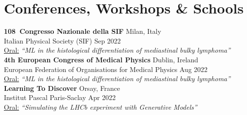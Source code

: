 \newcommand{\event}[2]
  {\normalsize \textbf{\color{hlcolor-0} #1} \hfill {\color{hlcolor-2} #2}}
  
\newcommand{\organizer}[2]
  {\small \color{hlcolor-1} {#1} \hfill {#2}}
  
\newcommand{\contribution}[3][]
  {\normalsize \color{maincolor} \ul{#2:} \emph{``#3''} {#1}}
  
\newcommand{\theme}[1]
  {\normalsize \color{maincolor} \ul{Theme:} \emph{#1}}
  
\newcommand{\button}[2]
  {\large \color{maincolor} \href{#1}{#2}}
  

\section*{Conferences, Workshops \& Schools}
\begin{cvcontent}
  \event{108\textdegree\ Congresso Nazionale della SIF}{Milan, Italy}\\
  \organizer{Italian Physical Society (SIF)}{Sep 2022}\\
  \contribution{Oral}{ML in the histological differentiation of mediastinal bulky lymphoma} \hfill
  \button{https://local.sif.it/repository/108/atticon14493}{\faFilePdf[regular]}
  \button{https://2022.congresso.sif.it/talk/525}{\faGlobe}
  \\ [4mm]
  \event{4th European Congress of Medical Physics}{Dublin, Ireland}\\
  \organizer{European Federation of Organisations for Medical Physics}{Aug 2022}\\
  \contribution{Oral}{ML in the histological differentiation of mediastinal bulky lymphoma} \hfill
  \button{https://www.ecmp2022.org/}{\faGlobe}
  \\ [4mm]
  \event{Learning To Discover}{Orsay, France}\\
  \organizer{Institut Pascal Paris-Saclay}{Apr 2022}\\
  \contribution{Oral}{Simulating the LHCb experiment with Generative Models} \hfill
  \button{https://indico.ijclab.in2p3.fr/event/5999/contributions/25660/attachments/18780/25338/Matteo_Barbetti_LTD2022.mp4}{\faFilm}
  \button{https://indico.ijclab.in2p3.fr/event/5999/contributions/25660/attachments/18780/25270/LTD_mbarbetti_sim_lhcb_with_gm.pdf}{\faFilePdf[regular]}
  \button{https://indico.ijclab.in2p3.fr/event/5999/contributions/25660/}{\faGlobe}

\end{cvcontent}
